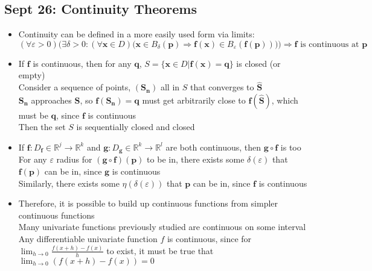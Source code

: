 \documentclass[10pt, oneside]{article}
\newcommand{\R}{\mathbb{R}}
\renewcommand{\vec}[1]{\mathbf{#1}}
\newcommand{\vecf}[1]{\boldsymbol{#1}}
\begin{document}
\subsection{Sept 26: Continuity Theorems}
\begin{itemize}
    \item Continuity can be defined in a more easily used form via limits:
        \[(\forall \varepsilon > 0) \Big(\exists \delta > 0 : (\forall \vec{x} \in D) \big(\vec{x} \in B_\delta(\vec{p}) \Rightarrow \vecf{f}(\vec{x}) \in B_\varepsilon(\vec{\vec{f}(\vec{p})}) \big) \Big) \Rightarrow \vecf{f} \text{ is continuous at $\vec{p}$}\]
    \item If $\vecf{f}$ is continuous, then for any $\vec{q}$, $S = \{\vec{x} \in D | \vec{f}(\vec{x}) = \vec{q}\}$ is closed (or empty)\\
        Consider a sequence of points, $(\vec{S_n})$ all in $S$ that converges to $\vec{\hat{S}}$\\ 
        $\vec{S_n}$ approaches $\vec{\hat{S}}$, so $\vecf{f}(\vec{S_n}) = \vec{q}$ must get arbitrarily close to $\vecf{f}(\vec{\hat{S}})$, which must be $\vec{q}$, since $\vecf{f}$ is continuous\\
        Then the set $S$ is sequentially closed and closed
    \item If $\vecf{f} : D_{\vecf{f}} \in \R^j \rightarrow \R^k$ and $\vecf{g} : D_{\vecf{g}} \in \R^k \rightarrow \R^l$ are both continuous, then $\vecf{g} \circ \vecf{f}$ is too\\
        For any $\varepsilon$ radius for $(\vecf{g} \circ \vecf{f})(\vec{p})$ to be in, there exists some $\delta(\varepsilon)$ that $\vec{f}(\vec{p})$ can be in, since $\vec{g}$ is continuous\\
        Similarly, there exists some $\eta(\delta(\varepsilon))$ that $\vec{p}$ can be in, since $\vecf{f}$ is continuous
    \item Therefore, it is possible to build up continuous functions from simpler continuous functions\\
    Many univariate functions previously studied are continuous on some interval\\
    Any differentiable univariate function $f$ is continuous, since for $\displaystyle \lim_{h \rightarrow 0} \frac{f(x+h) - f(x)}{h}$ to exist, it must be true that $\displaystyle \lim_{h \rightarrow 0} (f(x+h) - f(x)) = 0$
\end{itemize}
\end{document}

